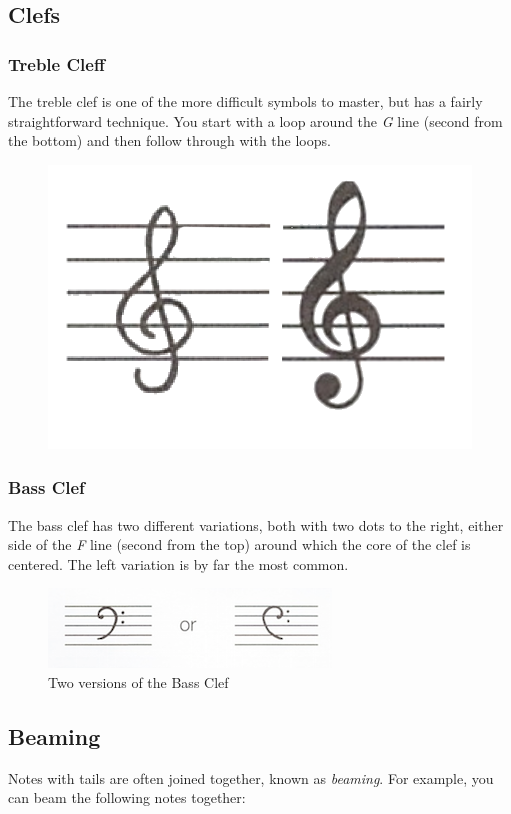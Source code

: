 \subsection*{Clefs}

\subsubsection*{Treble Cleff}

The treble clef is one of the more difficult symbols to master, but has a fairly straightforward technique. You start with a loop around the \emph{G} line (second from the bottom) and then follow through with the loops.

\begin{figure}[h!]
  \includegraphics[width=0.3\linewidth]{gfx/basic/treble-clef.png}
  \centering
  \label{fig:TrebleClef}
\end{figure}

\subsubsection*{Bass Clef}

The bass clef has two different variations, both with two dots to the right, either side of the \emph{F} line (second from the top) around which the core of the clef is centered. The left variation is by far the most common.

\begin{figure}[h!]
  \includegraphics[width=0.5\linewidth]{gfx/basic/bass-clef.png}
  \centering
  \caption{Two versions of the Bass Clef}
  \label{fig:BassClef}
\end{figure}

\subsection*{Beaming}

Notes with tails are often joined together, known as \emph{beaming}. For example, you can beam the following notes together:

